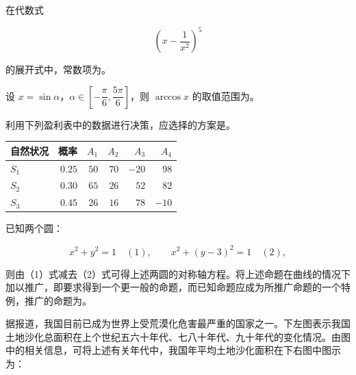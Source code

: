 \begin{question}
在代数式

\nopagebreak[4]
\[
\left(x-\frac1{x^2}\right)^5
\]

的展开式中，常数项为\gkblank{}。

\end{question}
\begin{question}
设 $x=\sin\alpha$，$\alpha\in\left[-\dfrac\pi6,\dfrac{5\pi}6\right]$，则 $\arccos x$ 的取值范围为\gkblank{}。

\end{question}
\begin{question}
利用下列盈利表中的数据进行决策，应选择的方案是\gkblank{}。

\begin{center}
\begin{tabular}{lrrrrr}
\toprule
自然状况 & 概率 & $A_1$ & $A_2$ & $A_3$ & $A_4$ \\
\midrule
$S_1$ & $0.25$ & $50$ & $70$ & $-20$ & $98$ \\
$S_2$ & $0.30$ & $65$ & $26$ & $52$ & $82$ \\
$S_3$ & $0.45$ & $26$ & $16$ & $78$ & $-10$ \\
\bottomrule
\end{tabular}
\end{center}

\end{question}
\begin{question}
已知两个圆：

\nopagebreak[4]
\[
x^2+y^2=1\quad(1),\qquad x^2+(y-3)^2=1\quad(2),
\]

则由（1）式减去（2）式可得上述两圆的对称轴方程。将上述命题在曲线的情况下加以推广，即要求得到一个更一般的命题，而已知命题应成为所推广命题的一个特例，推广的命题为\gkblank{}。

\Needspace{0.4\textheight}
\end{question}
\begin{question}
据报道，我国目前已成为世界上受荒漠化危害最严重的国家之一。下左图表示我国土地沙化总面积在上个世纪五六十年代、七八十年代、九十年代的变化情况。由图中的相关信息，可将上述有关年代中，我国年平均土地沙化面积在下右图中图示为：
\nopagebreak[4]
\begin{center}\end{center}
\nopagebreak[4]
\end{question}

